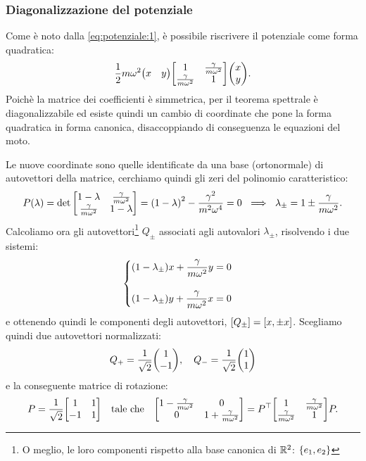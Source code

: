         \subsubsection{Diagonalizzazione del potenziale}
            Come \`e noto dalla \eqref{eq:potenziale:1}, \`e possibile riscrivere il potenziale come forma quadratica:
                $$\frac{1}{2}m\omega^2\mqty(x&y)\mqty[1 & \frac{\gamma}{m\omega^2} \\ \frac{\gamma}{m\omega^2} & 1]\mqty(x\\y).$$
            Poich\`e la matrice dei coefficienti \`e simmetrica, per il teorema spettrale \`e diagonalizzabile ed esiste quindi un cambio di coordinate che pone la forma quadratica in forma canonica, disaccoppiando di conseguenza le equazioni del moto.
            \par Le nuove coordinate sono quelle identificate da una base (ortonormale) di autovettori della matrice, cerchiamo quindi gli zeri del polinomio caratteristico:
                $$P\qty(\lambda)=\det\mqty[1-\lambda & \frac{\gamma}{m\omega^2} \\ \frac{\gamma}{m\omega^2} & 1-\lambda]=\qty(1-\lambda)^2-\frac{\gamma^2}{m^2\omega^4}=0\ \implies\ \lambda_{\pm}=1\pm\frac{\gamma}{m\omega^2}.$$
            Calcoliamo ora gli autovettori\footnote{O meglio, le loro componenti rispetto alla base canonica di $\mathbb{R}^2$: $\qty{e_1,e_2}$} $Q_{\pm}$ associati agli autovalori $\lambda_{\pm}$, risolvendo i due sistemi:
            \begin{equation*}
            \begin{cases}
                \displaystyle\qty(1-\lambda_{\pm})x+\frac{\gamma}{m\omega^2}y=0\\\\
                \displaystyle\qty(1-\lambda_{\pm})y+\frac{\gamma}{m\omega^2}x=0
            \end{cases}
            \end{equation*}
            e ottenendo quindi le componenti degli autovettori, $\qty[Q_{\pm}]=[x,\pm x]$. Scegliamo quindi due autovettori normalizzati:
                $$Q_{+}=\frac{1}{\sqrt{2}}\mqty(1 \\ -1),\quad Q_{-}=\frac{1}{\sqrt{2}}\mqty(1 \\ 1)$$
            e la conseguente matrice di rotazione:
                $$P=\frac{1}{\sqrt{2}}\mqty[1 & 1 \\ -1 & 1]\quad\text{tale che}\quad\mqty[1-\frac{\gamma}{m\omega^2} & 0 \\ 0 & 1+\frac{\gamma}{m\omega^2}]=P^\top\mqty[1 & \frac{\gamma}{m\omega^2} \\ \frac{\gamma}{m\omega^2} & 1]P.$$
